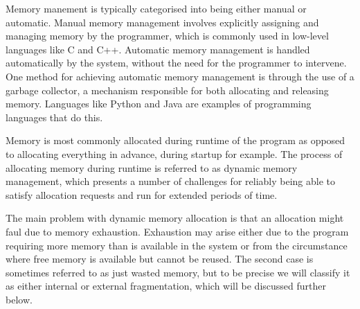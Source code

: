 
Memory manement is typically categorised into being either manual or automatic. Manual memory management involves explicitly assigning and managing memory by the programmer, which is commonly used in low-level languages like C and C++. Automatic memory management is handled automatically by the system, without the need for the programmer to intervene. One method for achieving automatic memory management is through the use of a garbage collector, a mechanism responsible for both allocating and releasing memory. Languages like Python and Java are examples of programming languages that do this.

Memory is most commonly allocated during runtime of the program as opposed to allocating everything in advance, during startup for example. The process of allocating memory during runtime is referred to as dynamic memory management, which presents a number of challenges for reliably being able to satisfy allocation requests and run for extended periods of time.

The main problem with dynamic memory allocation is that an allocation might faul due to memory exhaustion. Exhaustion may arise either due to the program requiring more memory than is available in the system or from the circumstance where free memory is available but cannot be reused. The second case is sometimes referred to as just wasted memory, but to be precise we will classify it as either internal or external fragmentation, which will be discussed further below.

